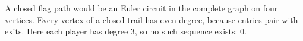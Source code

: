 A closed flag path would be an Euler circuit in the complete graph on four vertices. Every vertex of a closed trail has even degree, because entries pair with exits. Here each player has degree 3, so no such sequence exists: $\boxed0$.

